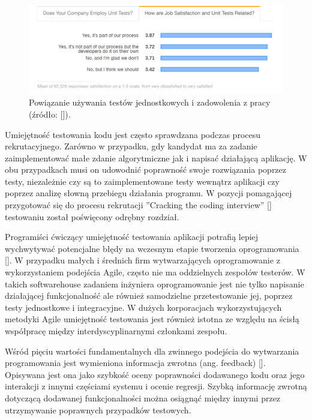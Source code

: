 \begin{figure}[h]
    \centering
    \includegraphics[width = 13cm]{chapter01/unit-tests-satisfaction.png}
    \caption{Powiązanie używania testów jednostkowych i zadowolenia z pracy (źródło: []).}
    \label{fig:unit-tests-satisfaction}
\end{figure}

Umiejętność testowania kodu jest często sprawdzana podczas procesu rekrutacyjnego.
Zarówno w przypadku, gdy kandydat ma za zadanie zaimplementować małe zdanie algorytmiczne jak i napisać działającą aplikację.
W obu przypadkach musi on udowodnić poprawność swoje rozwiązania poprzez testy, niezależnie czy są to zaimplementowane testy wewnątrz aplikacji czy poprzez analizę słowną przebiegu działania programu.
W pozycji pomagającej przygotować się do procesu rekrutacji ”Cracking the coding interview” [] testowaniu został poświęcony odrębny rozdział.

Programiści ćwiczący umiejętność testowania aplikacji potrafią lepiej wychwytywać potencjalne błędy na wczesnym etapie tworzenia oprogramowania [].
W przypadku małych i średnich firm wytwarzających oprogramowanie z wykorzystaniem podejścia Agile, często nie ma oddzielnych zespołów testerów.
W takich softwarehouse zadaniem inżyniera oprogramowanie jest nie tylko napisanie działającej funkcjonalność ale również samodzielne przetestowanie jej, poprzez testy jednostkowe i integracyjne.
W dużych korporacjach wykorzystujących metodyki Agile umiejętność testowania jest również istotna ze względu na ścisłą współpracę między interdyscyplinarnymi członkami zespołu.

Wśród pięciu wartości fundamentalnych dla zwinnego podejścia do wytwarzania programowania jest wymieniona informacja zwrotna (ang. feedback) [].
Opisywana jest ona jako szybkość oceny poprawności dodawanego kodu oraz jego interakcji z innymi częściami systemu i ocenie regresji.
Szybką informację zwrotną dotyczącą dodawanej funkcjonalności można osiągnąć między innymi przez utrzymywanie poprawnych przypadków testowych.

